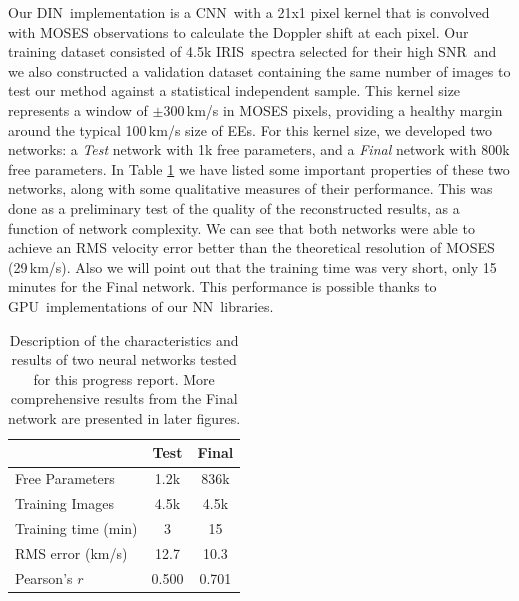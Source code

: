 \documentclass[10pt,letterpaper]{article}
\newcommand{\EEs}{\acp{EE}}
\newcommand{\NN}{\ac{NN}}
\newcommand{\CNN}{\ac{CNN}}
\newcommand{\DIN}{\ac{DIN}}
\newcommand{\IRIS}{\ac{IRIS}}
\newcommand{\GPU}{\ac{GPU}}
\newcommand{\SNR}{\ac{SNR}}
\begin{document}
			Our \DIN\ implementation is a \CNN\ with a 21x1 pixel kernel that is convolved with MOSES observations to calculate the Doppler shift at each pixel.
			Our training dataset consisted of 4.5k \IRIS\ spectra selected for their high \SNR\, and we also constructed a validation dataset containing the same number of images to test our method against a statistical independent sample.
			This kernel size represents a window of $\pm$300\,km/s in MOSES pixels, providing a healthy margin around the typical 100\,km/s size of \EEs \citep{Dere1994}.
			For this kernel size, we developed two networks: a \textit{Test} network with 1k free parameters, and a \textit{Final} network with 800k free parameters.
			In Table \ref{nn_table} we have listed some important properties of these two networks, along with some qualitative measures of their performance.
			This was done as a preliminary test of the quality of the reconstructed results, as a function of network complexity.
			We can see that both networks were able to achieve an RMS velocity error better than the theoretical resolution of MOSES (29\,km/s).
			Also we will point out that the training time was very short, only 15 minutes for the Final network.
			This performance is possible thanks to \GPU\ implementations of our \NN\ libraries.
			
			\begin{table}[t!]
				
				\centering
				\begin{tabular}{| l | c c |}
					\hline
					& Test & Final \\ \hline
					Free Parameters & 1.2k & 836k \\
					Training Images & 4.5k & 4.5k \\				
					Training time (min) & 3 & 15 \\ 
					RMS error (km/s) & 12.7 & 10.3 \\
					Pearson's $r$ & 0.500 & 0.701 \\ \hline				
				\end{tabular}					
				\caption{Description of the characteristics and results of two neural networks tested for this progress report. More comprehensive results from the Final network are presented in later figures.}
				\label{nn_table}
				
			\end{table}
		
\end{document}
